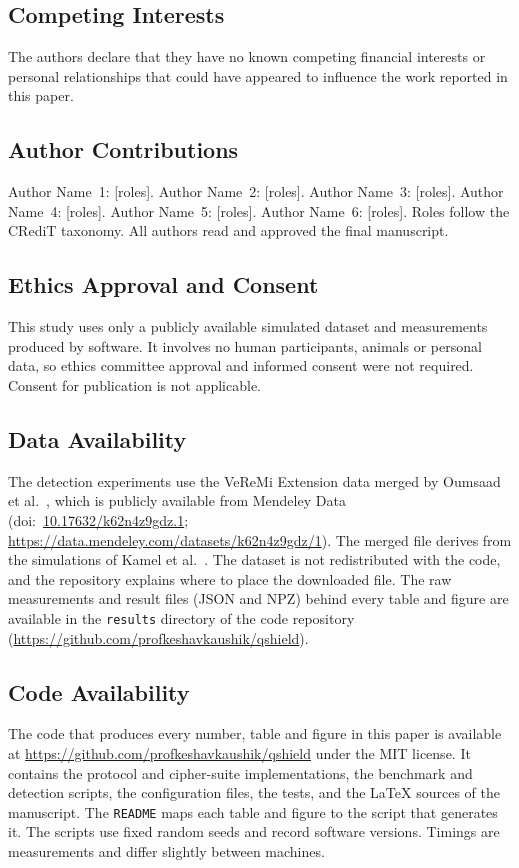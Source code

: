 \documentclass[journal,twoside]{IEEEtran}
\begin{document}
\subsection*{Competing Interests}
The authors declare that they have no known competing financial interests or personal relationships that could have appeared to influence the work reported in this paper.

\subsection*{Author Contributions}
Author Name~1: [roles]. Author Name~2: [roles]. Author Name~3: [roles]. Author Name~4: [roles]. Author Name~5: [roles]. Author Name~6: [roles]. Roles follow the CRediT taxonomy. All authors read and approved the final manuscript.

\subsection*{Ethics Approval and Consent}
This study uses only a publicly available simulated dataset and measurements produced by software. It involves no human participants, animals or personal data, so ethics committee approval and informed consent were not required. Consent for publication is not applicable.

\subsection*{Data Availability}
The detection experiments use the VeReMi Extension data merged by Oumsaad et al.\ \cite{oumsaad2023}, which is publicly available from Mendeley Data (doi:~\href{https://doi.org/10.17632/k62n4z9gdz.1}{10.17632/k62n4z9gdz.1}; \url{https://data.mendeley.com/datasets/k62n4z9gdz/1}). The merged file derives from the simulations of Kamel et al.\ \cite{kamel2020}. The dataset is not redistributed with the code, and the repository explains where to place the downloaded file. The raw measurements and result files (JSON and NPZ) behind every table and figure are available in the \texttt{results} directory of the code repository (\url{https://github.com/profkeshavkaushik/qshield}).

\subsection*{Code Availability}
The code that produces every number, table and figure in this paper is available at \url{https://github.com/profkeshavkaushik/qshield} under the MIT license. It contains the protocol and cipher-suite implementations, the benchmark and detection scripts, the configuration files, the tests, and the LaTeX sources of the manuscript. The \texttt{README} maps each table and figure to the script that generates it. The scripts use fixed random seeds and record software versions. Timings are measurements and differ slightly between machines.
\end{document}
